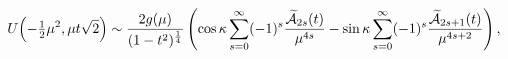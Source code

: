 \[\mathop{U\/}\nolimits\!\left(-\tfrac{1}{2}\mu^{2},\mu t\sqrt{2}\right)\sim%
\frac{2g(\mu)}{(1-t^{2})^{\frac{1}{4}}}\*\left(\mathop{\cos\/}\nolimits\kappa%
\sum_{s=0}^{\infty}(-1)^{s}\frac{\widetilde{\cal{A}}_{2s}(t)}{\mu^{4s}}-%
\mathop{\sin\/}\nolimits\kappa\sum_{s=0}^{\infty}(-1)^{s}\frac{\widetilde{\cal%
{A}}_{2s+1}(t)}{\mu^{4s+2}}\right),\]